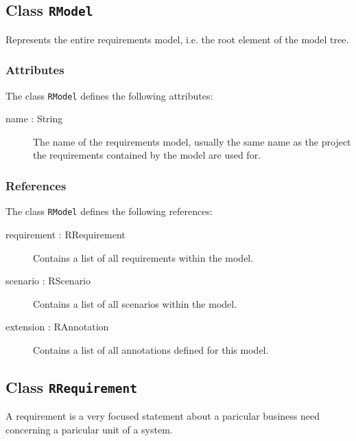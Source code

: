 
\subsection{Class {\tt RModel}}
Represents the entire requirements model, i.e. the root element of the model tree.

\subsubsection{Attributes}
The class \verb|RModel| defines the following attributes:
\begin{description}
	\item[name : String] The name of the requirements model, usually the same name as the project the requirements contained by the model are used for.
\end{description}

\subsubsection{References}
The class \verb|RModel| defines the following references:
\begin{description}
	\item[requirement : RRequirement] Contains a list of all requirements within the model.
	\item[scenario : RScenario] Contains a list of all scenarios within the model.
	\item[extension : RAnnotation] Contains a list of all annotations defined for this model.
\end{description}

\subsection{Class {\tt RRequirement}}
A requirement is a very focused statement about a paricular business need concerning a paricular unit of a system.

